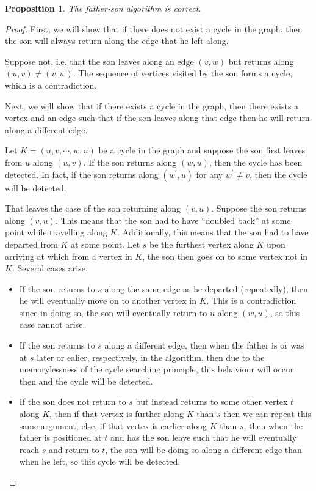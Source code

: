 \documentclass[11pt,letterpaper]{article}
\newtheorem{proposition}{Proposition}
\begin{document}
\begin{proposition}
    The father-son algorithm is correct.
\end{proposition}

\begin{proof}
    First, we will show that if there does not exist a cycle in the graph, then
    the son will always return along the edge that he left along.

    Suppose not, i.e. that the son leaves along an edge $(v, w)$ but returns
    along $(u, v) \neq (v, w)$. The sequence of vertices visited by the son
    forms a cycle, which is a contradiction.

    Next, we will show that if there exists a cycle in the graph, then there
    exists a vertex and an edge such that if the son leaves along that edge
    then he will return along a different edge.

    Let $K = (u, v, \cdots, w, u)$ be a cycle in the graph and suppose the son
    first leaves from $u$ along $(u, v)$. If the son returns along $(w, u)$,
    then the cycle has been detected. In fact, if the son returns along
    $(w^\prime, u)$ for any $w^\prime \neq v$, then the cycle will be detected.

    That leaves the case of the son returning along $(v, u)$. Suppose the son
    returns along $(v, u)$. This means that the son had to have ``doubled
    back'' at some point while travelling along $K$. Additionally, this means
    that the son had to have departed from $K$ at some point. Let $s$ be the
    furthest vertex along $K$ upon arriving at which from a vertex in $K$, the
    son then goes on to some vertex not in $K$. Several cases arise.

    \begin{itemize}
        \item
            If the son returns to $s$ along the same edge as he departed
            (repeatedly), then he will eventually move on to another vertex in
            $K$. This is a contradiction since in doing so, the son will
            eventually return to $u$ along $(w, u)$, so this case cannot arise.

        \item
            If the son returns to $s$ along a different edge, then when the
            father is or was at $s$ later or ealier, respectively, in the
            algorithm, then due to the memorylessness of the cycle searching
            principle, this behaviour will occur then and the cycle will be
            detected.

        \item
            If the son does not return to $s$ but instead returns to some other
            vertex $t$ along $K$, then if that vertex is further along $K$ than
            $s$ then we can repeat this same argument; else, if that vertex is
            earlier along $K$ than $s$, then when the father is positioned at
            $t$ and has the son leave such that he will eventually reach $s$
            and return to $t$, the son will be doing so along a different edge
            than when he left, so this cycle will be detected.
    \end{itemize}
\end{proof}
\end{document}
